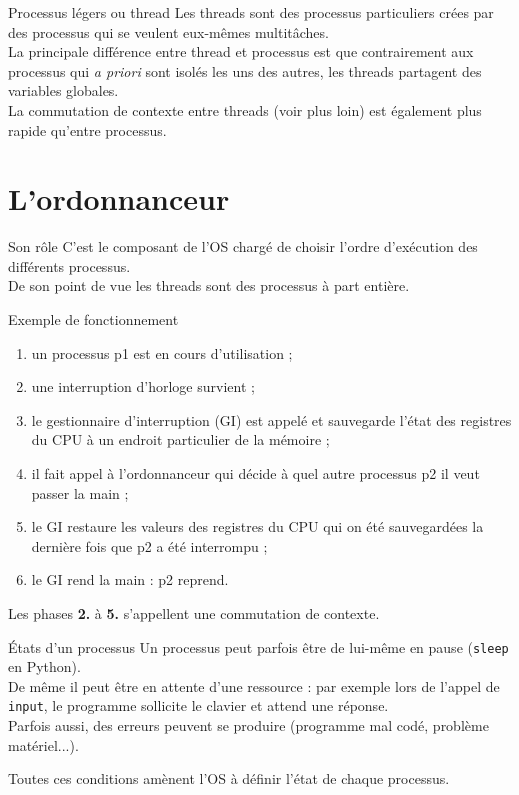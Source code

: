 \documentclass[10pt]{beamer}
\begin{document}
\begin{frame}{Processus légers ou thread}\pause
Les \alert{threads} sont des processus particuliers crées par des processus qui se veulent eux-mêmes multitâches.\\\pause
La principale différence entre thread et processus est que contrairement aux processus qui \textit{a priori} sont isolés les uns des autres, les threads \alert{partagent des variables globales}.\\\pause
La commutation de contexte entre threads (voir plus loin) est également plus rapide qu'entre processus.\\

\end{frame}

\section{L'ordonnanceur}

\begin{frame}{Son rôle}\pause
C'est le composant de l'OS chargé de \alert{choisir l'ordre d'exécution} des différents processus.\\\pause
De son point de vue les threads sont des processus à part entière.
\end{frame}
\begin{frame}{Exemple de fonctionnement}\pause
\begin{enumerate}
	\item un processus p1 est en cours d'utilisation ;\pause
    \item une interruption d'horloge survient ;\pause
    \item le \alert{gestionnaire d'interruption} (GI) est appelé et sauvegarde l'état des registres du CPU à un endroit particulier de la mémoire ;\pause
    \item il fait appel à l'\alert{ordonnanceur} qui \alert{décide} à quel autre processus p2  il veut passer la main ;\pause
    \item le GI restaure les valeurs des registres du CPU qui on été sauvegardées la dernière fois que p2 a été interrompu ;\pause
    \item le GI rend la main : p2 reprend.
\end{enumerate}
Les phases \textbf{2.} à \textbf{5.} s'appellent une \alert{commutation de contexte}.\pause
\end{frame}
\begin{frame}{\'Etats d'un processus}\pause
Un processus peut parfois être de lui-même en pause (\texttt{sleep} en Python).\\\pause
De même il peut être en attente d'une ressource : par exemple lors de l'appel de \texttt{input}, le programme sollicite le clavier et attend une réponse.\\\pause
Parfois aussi, des erreurs peuvent se produire (programme mal codé, problème matériel...).\\\pause

Toutes ces conditions amènent l'OS à définir l'\alert{état} de chaque processus.
\end{frame}
\end{document}
